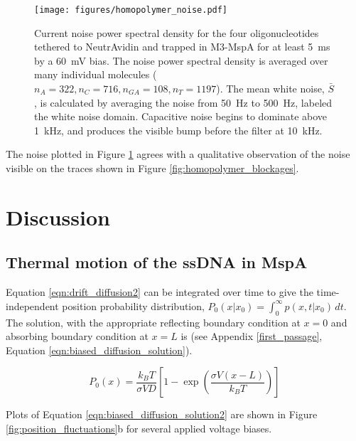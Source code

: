 \begin{figure}[h]
\begin{centering}
\texttt{[image: figures/homopolymer\_noise.pdf]}
\caption[Current fluctuations for all homopolymer ssDNA]{Current noise power spectral density for the four oligonucleotides tethered to NeutrAvidin and trapped in M3-MspA for at least \SI{5}{\ms} by a \SI{60}{\mV} bias.  The noise power spectral density is averaged over many individual molecules ($n_A=322, n_C=716, n_{GA}=108, n_T=1197$).  The mean white noise, $\bar{S}$, is calculated by averaging the noise from \SI{50}{\Hz} to \SI{500}{\Hz}, labeled the white noise domain.  Capacitive noise begins to dominate above \SI{1}{\kHz}, and produces the visible bump before the filter at \SI{10}{\kHz}.}
\label{fig:homopolymer_fluctuations}
\end{centering}
\end{figure}

The noise plotted in Figure \ref{fig:homopolymer_fluctuations} agrees with a qualitative observation of the noise visible on the traces shown in Figure \ref{fig:homopolymer_blockages}.

\section{Discussion}

\subsection{Thermal motion of the ssDNA in MspA}

Equation \ref{eqn:drift_diffusion2} can be integrated over time to give the time-independent position probability distribution, $P_0(x|x_0) = \int_0^{\infty} p(x,t|x_0) \, dt$.  The solution, with the appropriate reflecting boundary condition at $x=0$ and absorbing boundary condition at $x=L$ is (see Appendix \ref{first_passage}, Equation \ref{eqn:biased_diffusion_solution}).

\begin{equation}
P_0(x) = \frac{k_B T}{\sigma V D} \left[ 1 - \exp{ \left( \frac{\sigma V (x-L)}{k_B T} \right) } \right]
\label{eqn:biased_diffusion_solution2}
\end{equation}

Plots of Equation \ref{eqn:biased_diffusion_solution2} are shown in Figure \ref{fig:position_fluctuations}b for several applied voltage biases.

